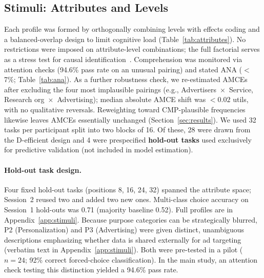 \documentclass{eusset}
\begin{document}
\subsection{Stimuli: Attributes and Levels}
Each profile was formed by orthogonally combining levels with effects coding and a balanced-overlap design to limit cognitive load (Table~\ref{tab:attributes}). No restrictions were imposed on attribute-level combinations; the full factorial serves as a stress test for causal identification~\citep{Hainmueller2014ConjointID}. Comprehension was monitored via attention checks (94.6\% pass rate on an unusual pairing) and stated ANA ($<$7\%; Table~\ref{tab:ana}). As a further robustness check, we re-estimated AMCEs after excluding the four most implausible pairings (e.g., Advertisers~$\times$~Service, Research org~$\times$~Advertising); median absolute AMCE shift was $<0.02$ utils, with no qualitative reversals. Reweighting toward CMP-plausible frequencies likewise leaves AMCEs essentially unchanged (Section~\ref{sec:results}). We used 32 tasks per participant split into two blocks of 16. Of these, 28 were drawn from the D-efficient design and 4 were prespecified \textbf{hold-out tasks} used exclusively for predictive validation (not included in model estimation).

\paragraph{Hold-out task design.}
Four fixed hold-out tasks (positions 8, 16, 24, 32) spanned the attribute space; Session~2 reused two and added two new ones. Multi-class choice accuracy on Session~1 hold-outs was 0.71 (majority baseline 0.52). Full profiles are in Appendix~\ref{app:stimuli}. Because purpose categories can be strategically blurred, P2 (Personalization) and P3 (Advertising) were given distinct, unambiguous descriptions emphasizing whether data is shared externally for ad targeting (verbatim text in Appendix~\ref{app:stimuli}). Both were pre-tested in a pilot ($n=24$; 92\% correct forced-choice classification). In the main study, an attention check testing this distinction yielded a 94.6\% pass rate.
\end{document}
